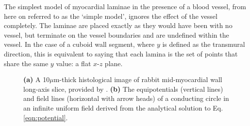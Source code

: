   The simplest model of myocardial laminae in the presence of a blood vessel, from here on referred to as the `simple model', ignores the effect of the vessel completely. The laminae are placed exactly as they would have been with no vessel, but terminate on the vessel boundaries and are undefined within the vessel. In the case of a cuboid wall segment, where $y$ is defined as the transmural direction, this is equivalent to saying that each lamina is the set of points that share the same $y$ value: a flat $x$-$z$ plane.

	\begin{figure}[htbp]
		\centering
		\qquad
    \caption{\textbf{(a)} A 10$\mu$m-thick histological image of rabbit mid-myocardial wall long-axis slice, provided by \cite{Burton2006}. \textbf{(b)} The equipotentials (vertical lines) and field lines (horizontal with arrow heads) of a conducting circle in an infinite uniform field derived from the analytical solution to Eq. \ref{eqn:potential}.}
	  \label{fig:vessel}
	\end{figure}
  
